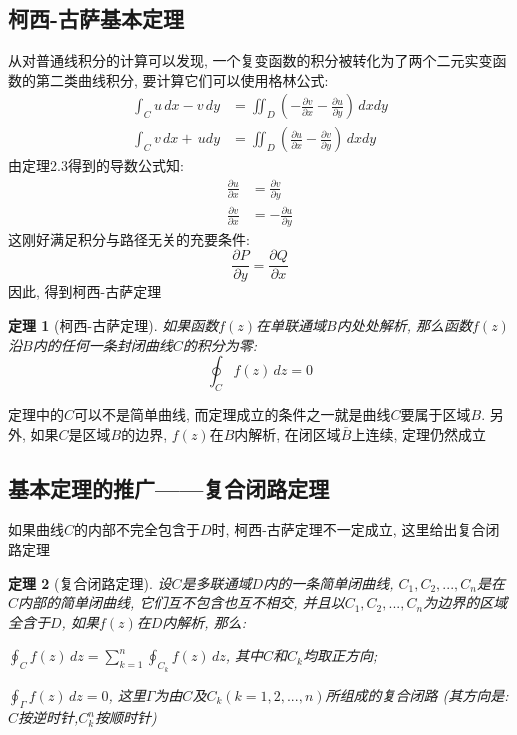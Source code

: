 \documentclass[12pt, a4paper, oneside]{ctexart}
\theoremstyle{plain}
\newtheorem{theorem}{定理}[section]
\theoremstyle{definition}
\theoremstyle{definition}
\begin{document}
\subsection{柯西-古萨基本定理}
从对普通线积分的计算可以发现, 一个复变函数的积分被转化为了两个二元实变函数的第二类曲线积分, 要计算它们可以使用格林公式:
\begin{align*}
    \int_{C}u\,dx-v\,dy &= \iint_{D}(-\frac{\partial v}{\partial x}-\frac{\partial u}{\partial y})\,dxdy \\
    \int_{C}v\,dx+\,udy &= \iint_{D}(\frac{\partial u}{\partial x}-\frac{\partial v}{\partial y})\,dxdy
\end{align*}
由定理2.3得到的导数公式知:
\begin{align*}
\frac{\partial u}{\partial x} &= \frac{\partial v}{\partial y}\\
\frac{\partial v}{\partial x} &= -\frac{\partial u}{\partial y}
\end{align*}
这刚好满足积分与路径无关的充要条件:
\[
    \frac{\partial P}{\partial y}=\frac{\partial Q}{\partial x}
\]
因此, 得到柯西-古萨定理
\begin{theorem}[柯西-古萨定理]
    如果函数$f(z)$在单联通域$B$内处处解析, 那么函数$f(z)$沿$B$内的任何一条封闭曲线$C$的积分为零:
    \[
    \oint_{C}f(z)\,dz=0
    \]
\end{theorem}
定理中的$C$可以不是简单曲线, 而定理成立的条件之一就是曲线$C$要属于区域$B$. 另外, 如果$C$是区域$B$的边界,
$f(z)$在$B$内解析, 在闭区域$\bar{B}$上连续, 定理仍然成立

\subsection{基本定理的推广——复合闭路定理}
如果曲线$C$的内部不完全包含于$D$时, 柯西-古萨定理不一定成立, 这里给出复合闭路定理
\begin{theorem}[复合闭路定理]
    \hspace{0em}
    
    设$C$是多联通域$D$内的一条简单闭曲线, $C_1,C_2,...,C_n$是在$C$内部的简单闭曲线, 它们互不包含也互不相交, 
并且以$C_1,C_2,...,C_n$为边界的区域全含于$D$, 如果$f(z)$在$D$内解析, 那么: 

$\oint_{C}f(z)\,dz=\sum_{k=1}^{n}\oint_{C_k}f(z)\,dz$, 其中$C$和$C_k$均取正方向; 

$\oint_{\Gamma}f(z)\,dz=0$, 这里$\Gamma$为由$C$及$C_k(k=1,2,...,n)$所组成的复合闭路
(其方向是:$C$按逆时针,$C_k^n$按顺时针)

\end{theorem}
\end{document}
